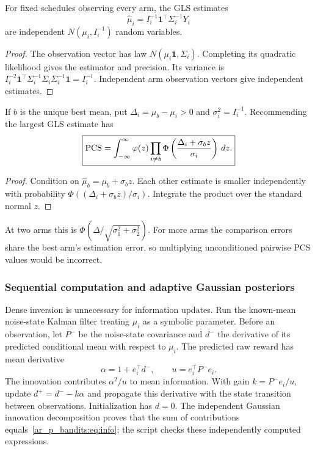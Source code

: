 \begin{proposition}
For fixed schedules observing every arm, the GLS estimates
\begin{equation}
\widehat\mu_i=I_i^{-1}\mathbf1^\top\Sigma_i^{-1}Y_i
\end{equation}
are independent $N(\mu_i,I_i^{-1})$ random variables.
\end{proposition}
\begin{proof}
The observation vector has law $N(\mu_i\mathbf1,\Sigma_i)$. Completing its quadratic likelihood gives the estimator and precision. Its variance is $I_i^{-2}\mathbf1^\top\Sigma_i^{-1}\Sigma_i\Sigma_i^{-1}\mathbf1=I_i^{-1}$. Independent arm observation vectors give independent estimates.
\end{proof}

\begin{theorem}
If $b$ is the unique best mean, put $\Delta_i=\mu_b-\mu_i>0$ and $\sigma_i^2=I_i^{-1}$. Recommending the largest GLS estimate has
\begin{equation}
\boxed{\operatorname{PCS}=
\int_{-\infty}^{\infty}\varphi(z)
\prod_{i\ne b}\Phi\left(\frac{\Delta_i+\sigma_bz}{\sigma_i}\right)\,dz.}
\label{ar_p_bandits:eq:pcs}
\end{equation}
\end{theorem}
\begin{proof}
Condition on $\widehat\mu_b=\mu_b+\sigma_bz$. Each other estimate is smaller independently with probability $\Phi((\Delta_i+\sigma_bz)/\sigma_i)$. Integrate the product over the standard normal $z$.
\end{proof}
At two arms this is $\Phi(\Delta/\sqrt{\sigma_1^2+\sigma_2^2})$. For more arms the comparison errors share the best arm's estimation error, so multiplying unconditioned pairwise PCS values would be incorrect.

\subsubsection{Sequential computation and adaptive Gaussian posteriors}
Dense inversion is unnecessary for information updates. Run the known-mean noise-state Kalman filter treating $\mu_i$ as a symbolic parameter. Before an observation, let $P^-$ be the noise-state covariance and $d^-$ the derivative of its predicted conditional mean with respect to $\mu_i$. The predicted raw reward has mean derivative
\[
\alpha=1+e_i^\top d^-,\qquad u=e_i^\top P^-e_i.
\]
The innovation contributes $\alpha^2/u$ to mean information. With gain $k=P^-e_i/u$, update $d^+=d^--k\alpha$ and propagate this derivative with the state transition between observations. Initialization has $d=0$. The independent Gaussian innovation decomposition proves that the sum of contributions equals~\eqref{ar_p_bandits:eq:info}; the script checks these independently computed expressions.

